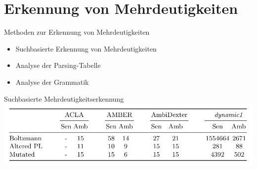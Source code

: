 \documentclass[t]{beamer}
\begin{document}
	\section{Erkennung von Mehrdeutigkeiten}\label{sec:erkennung-von-mehrdeutigkeiten}
	\begin{frame}
		\begin{block}{Methoden zur Erkennung von Mehrdeutigkeiten}
			\begin{itemize}
				\item Suchbasierte Erkennung von Mehrdeutigkeiten
				\item Analyse der Parsing-Tabelle
				\item Analyse der Grammatik
			\end{itemize}
		\end{block}
		\begin{exampleblock}{Suchbasierte Mehrdeutigkeitserkennung \cite{springer2013}}
			\includegraphics[width=\textwidth]{./detectors}
		\end{exampleblock}
	\end{frame}
\end{document}
